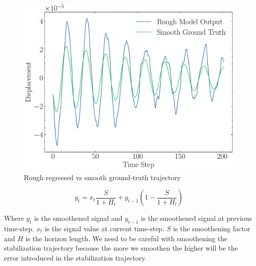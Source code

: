 \begin{figure}[H]
    \centering
    \includegraphics[scale=0.41]{images/fig_chapter4/nn_related/rough_mo_smooth_gt.pdf}
    \caption{Rough regressed vs smooth ground-truth trajectory}
    \label{fig:rough_mo_smooth_gt}
\end{figure}

\begin{equation}[H]
    y_t = x_t  \frac{S}{1+H_l} + y_{t-1}(1 - \frac{S}{1+H_l})
    \label{eqn:emaf}
\end{equation}

Where $ y_t $ is the smoothened signal and $ y_{t-1} $ is the smoothened signal at previous time-step. $ x_t $ is the signal value at current time-step. $ S $ is the smoothening factor and $ H $ is the horizon length. We need to be careful with smoothening the stabilization trajectory because the more we smoothen the higher will be the error introduced in the stabilization trajectory.


